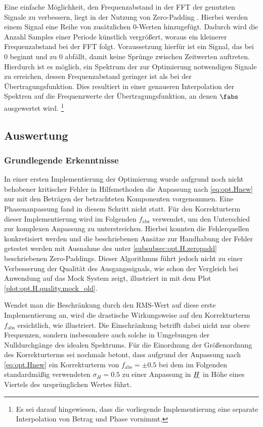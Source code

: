 \documentclass[../Report.tex]{subfiles}
\begin{document}
Eine einfache Möglichkeit, den Frequenzabstand in der FFT der genutzten Signale zu verbessern, liegt in der Nutzung von Zero-Padding \cite{zeropad}. Hierbei werden einem Signal eine Reihe von zusätzlichen 0-Werten hinzugefügt. Dadurch wird die Anzahl Samples einer Periode künstlich vergrößert, woraus ein kleinerer Frequenzabstand bei der FFT folgt. Voraussetzung hierfür ist ein Signal, das bei 0 beginnt und zu 0 abfällt, damit keine Sprünge zwischen Zeitwerten auftreten.
Hierdurch ist es möglich, ein Spektrum der zur Optimierung notwendigen Signale zu erreichen, dessen Frequenzabstand geringer ist als bei der Übertragungsfunktion.
Dies resultiert in einer genaueren Interpolation der Spektren auf die Frequenzwerte der Übertragungsfunktion, an denen $\fabs$ ausgewertet wird.
\footnote{Es sei darauf hingewiesen, dass die vorliegende Implementierung eine separate Interpolation von Betrag und Phase vornimmt.}

 

\subsection{Auswertung}
\label{subsec:opt.H.auswertung}

\subsubsection{Grundlegende Erkenntnisse}

In einer ersten Implementierung der Optimierung wurde aufgrund noch nicht behobener kritischer Fehler in Hilfsmethoden die Anpassung nach \eqref{eq:opt.Hnew} nur mit den Beträgen der betrachteten Komponenten vorgenommen. Eine Phasenanpassung fand in diesem Schritt nicht statt. Für den Korrekturterm dieser Implementierung wird im Folgenden $f_{\mathrm{abs}}$ verwendet, um den Unterschied zur komplexen Anpassung zu unterstreichen.
Hierbei konnten die Fehlerquellen konkretisiert werden und die beschriebenen Ansätze zur Handhabung der Fehler getestet werden mit Ausnahme des unter \ref{subsubsec:opt.H.zeropadd} beschriebenen Zero-Paddings.
Dieser Algorithmus führt jedoch nicht zu einer Verbesserung der Qualität des Ausgangssignals, wie schon der Vergleich bei Anwendung auf das Mock System zeigt, illustriert in  mit dem Plot \ref{plot:opt.H.quality.mock_old}. 

Wendet man die Beschränkung durch den RMS-Wert auf diese erste Implementierung an, wird die drastische Wirkungsweise auf den Korrekturterm $f_{\mathrm{abs}}$ ersichtlich, wie  illustriert. Die Einschränkung betrifft dabei nicht nur obere Frequenzen, sondern insbesondere auch solche in Umgebungen der Nulldurchgänge des idealen Spektrums.
Für die Einordnung der Größenordnung des Korrekturterms sei nochmals betont, dass aufgrund der Anpassung nach \eqref{eq:opt.Hnew} ein Korrekturterm von $f_{\mathrm{abs}} = \pm 0.5$ bei dem im Folgenden standardmäßig verwendeten $\sigma_H = 0.5$ zu einer Anpassung in $\underline{H}$ in Höhe eines Viertels des ursprünglichen Wertes führt.
\end{document}
